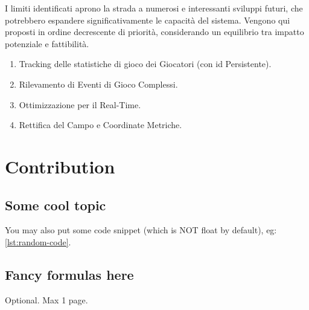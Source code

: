 \documentclass[12pt,a4paper,openright,twoside]{book}
\begin{document}
I limiti identificati aprono la strada a numerosi e interessanti
sviluppi futuri, che potrebbero espandere significativamente le
capacità del sistema. 
Vengono qui proposti in ordine decrescente di priorità, 
considerando un equilibrio tra impatto potenziale e fattibilità.

\begin{enumerate}
  \item Tracking delle statistiche di gioco dei 
  Giocatori (con \ac{id} Persistente).
  \item Rilevamento di Eventi di Gioco Complessi.
  \item Ottimizzazione per il Real-Time.
  \item Rettifica del Campo e Coordinate Metriche.
\end{enumerate}

\chapter{Contribution}

\section{Some cool topic}

You may also put some code snippet (which is NOT float by default), eg: \cref{lst:random-code}.



\section{Fancy formulas here}


\backmatter

\nocite{*} %
\printbibliography

\begin{acknowledgements} %
Optional. Max 1 page.
\end{acknowledgements}
\end{document}

